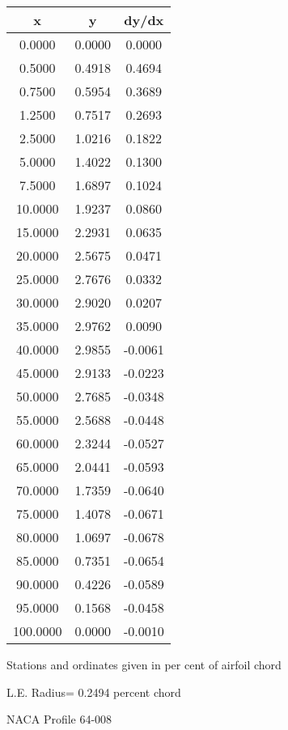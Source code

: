 \documentclass[11pt]{book}
\begin{document}
 \vspace{8mm}
 \begin{tabular}{|c|c|c|} \hline 
  x  &  y  &  dy/dx \\
 \hline
0.0000 & 0.0000 & 0.0000 \\
0.5000 & 0.4918 & 0.4694 \\
0.7500 & 0.5954 & 0.3689 \\
1.2500 & 0.7517 & 0.2693 \\
2.5000 & 1.0216 & 0.1822 \\
5.0000 & 1.4022 & 0.1300 \\
7.5000 & 1.6897 & 0.1024 \\
10.0000 & 1.9237 & 0.0860 \\
15.0000 & 2.2931 & 0.0635 \\
20.0000 & 2.5675 & 0.0471 \\
25.0000 & 2.7676 & 0.0332 \\
30.0000 & 2.9020 & 0.0207 \\
35.0000 & 2.9762 & 0.0090 \\
40.0000 & 2.9855 & -0.0061 \\
45.0000 & 2.9133 & -0.0223 \\
50.0000 & 2.7685 & -0.0348 \\
55.0000 & 2.5688 & -0.0448 \\
60.0000 & 2.3244 & -0.0527 \\
65.0000 & 2.0441 & -0.0593 \\
70.0000 & 1.7359 & -0.0640 \\
75.0000 & 1.4078 & -0.0671 \\
80.0000 & 1.0697 & -0.0678 \\
85.0000 & 0.7351 & -0.0654 \\
90.0000 & 0.4226 & -0.0589 \\
95.0000 & 0.1568 & -0.0458 \\
100.0000 & 0.0000 & -0.0010 \\
 \hline
 \end{tabular}
 \vspace{8mm}


Stations and ordinates given in per cent of airfoil chord 


L.E. Radius=  0.2494 percent chord
 \newpage
  \label{p64-008}
 \begin{Large}
 NACA Profile 64-008
 \end{Large}
  
\end{document}
